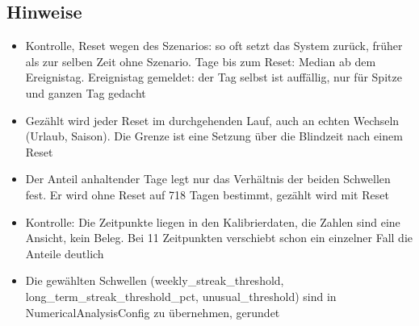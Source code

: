 \subsection*{Hinweise}
\begin{itemize}
\item Kontrolle, Reset wegen des Szenarios: so oft setzt das System zurück, früher als zur selben Zeit ohne Szenario. Tage bis zum Reset: Median ab dem Ereignistag. Ereignistag gemeldet: der Tag selbst ist auffällig, nur für Spitze und ganzen Tag gedacht
\item Gezählt wird jeder Reset im durchgehenden Lauf, auch an echten Wechseln (Urlaub, Saison). Die Grenze ist eine Setzung über die Blindzeit nach einem Reset
\item Der Anteil anhaltender Tage legt nur das Verhältnis der beiden Schwellen fest. Er wird ohne Reset auf 718 Tagen bestimmt, gezählt wird mit Reset
\item Kontrolle: Die Zeitpunkte liegen in den Kalibrierdaten, die Zahlen sind eine Ansicht, kein Beleg. Bei 11 Zeitpunkten verschiebt schon ein einzelner Fall die Anteile deutlich
\item Die gewählten Schwellen (weekly\_\allowbreak{}streak\_\allowbreak{}threshold, long\_\allowbreak{}term\_\allowbreak{}streak\_\allowbreak{}threshold\_\allowbreak{}pct, unusual\_\allowbreak{}threshold) sind in NumericalAnalysisConfig zu übernehmen, gerundet
\end{itemize}
